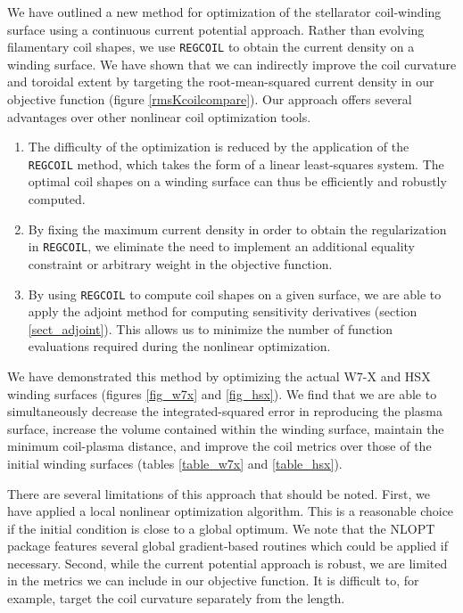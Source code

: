 \documentclass[aps,unsortedaddress]{revtex4-1}
\begin{document}
We have outlined a new method for optimization of the stellarator coil-winding surface using a continuous current potential approach. Rather than evolving filamentary coil shapes, we use \texttt{REGCOIL} to obtain the current density on a winding surface. We have shown that we can indirectly improve the coil curvature and toroidal extent by targeting the root-mean-squared current density in our objective function (figure \ref{rmsKcoilcompare}). Our approach offers several advantages over other nonlinear coil optimization tools.
\begin{enumerate}
\item The difficulty of the optimization is reduced by the application of the \texttt{REGCOIL} method, which takes the form of a linear least-squares system. The optimal coil shapes on a winding surface can thus be efficiently and robustly computed. 
\item By fixing the maximum current density in order to obtain the regularization in \texttt{REGCOIL}, we eliminate the need to implement an additional equality constraint or arbitrary weight in the objective function. 
\item By using \texttt{REGCOIL} to compute coil shapes on a given surface, we are able to apply the adjoint method for computing sensitivity derivatives (section \ref{sect_adjoint}). This allows us to minimize the number of function evaluations required during the nonlinear optimization. 
\end{enumerate} 
We have demonstrated this method by optimizing the actual W7-X and HSX winding surfaces (figures \ref{fig_w7x} and \ref{fig_hsx}). We find that we are able to simultaneously decrease the integrated-squared error in reproducing the plasma surface, increase the volume contained within the winding surface, maintain the minimum coil-plasma distance, and improve the coil metrics over those of the initial winding surfaces (tables \ref{table_w7x} and \ref{table_hsx}). 

There are several limitations of this approach that should be noted. First, we have applied a local nonlinear optimization algorithm. This is a reasonable choice if the initial condition is close to a global optimum. We note that the NLOPT package features several global gradient-based routines which could be applied if necessary. Second, while the current potential approach is robust, we are limited in the metrics we can include in our objective function. It is difficult to, for example, target the coil curvature separately from the length.
\end{document}
